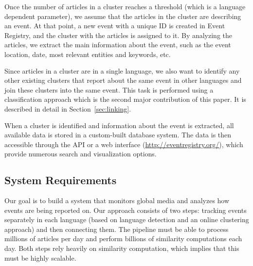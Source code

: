 \documentclass[twoside,11pt]{article}
\begin{document}
Once the number of articles in a cluster reaches a threshold (which is a language dependent parameter), we assume that the articles in the cluster are describing an event. At that point, a new event with a unique ID is created in Event Registry, and the cluster with the articles is assigned to it. By analyzing the articles, we extract the main information about the event, such as the event location, date, most relevant entities and keywords, etc.

Since articles in a cluster are in a single language, we also want to identify any other existing clusters that report about the same event in other languages and join these clusters into the same event. This task is performed using a classification approach which is the second major contribution of this paper. It is described in detail in Section~\ref{sec:linking}.

When a cluster is identified and information about the event is extracted, all available data is stored in a custom-built database system. The data is then accessible through the API or a web interface (\url{http://eventregistry.org/}), which provide numerous search and visualization options.


\subsection{System Requirements}
\label{sec:sysreq}

Our goal is to build a system that monitors global media and analyzes how events are being reported on. Our approach consists of two steps: tracking events separately in each language (based on language detection and an online clustering approach) and then connecting them. The pipeline must be able to process millions of articles per day and perform billions of similarity computations each day. Both steps rely heavily on similarity computation, which implies that this must be highly scalable.
\end{document}
